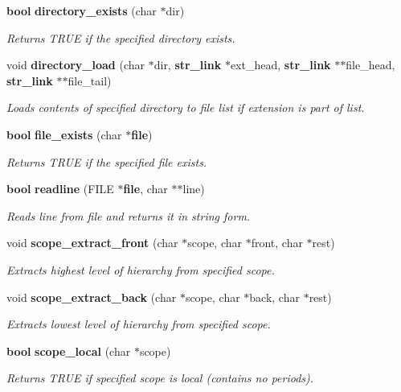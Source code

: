 \begin{CompactItemize}
{\bf bool} {\bf directory\_\-exists} (char $\ast$dir)
\begin{CompactList}\small\item\em Returns TRUE if the specified directory exists.\item\end{CompactList}\item 
void {\bf directory\_\-load} (char $\ast$dir, {\bf str\_\-link} $\ast$ext\_\-head, {\bf str\_\-link} $\ast$$\ast$file\_\-head, {\bf str\_\-link} $\ast$$\ast$file\_\-tail)
\begin{CompactList}\small\item\em Loads contents of specified directory to file list if extension is part of list.\item\end{CompactList}\item 
{\bf bool} {\bf file\_\-exists} (char $\ast${\bf file})
\begin{CompactList}\small\item\em Returns TRUE if the specified file exists.\item\end{CompactList}\item 
{\bf bool} {\bf readline} (FILE $\ast${\bf file}, char $\ast$$\ast$line)
\begin{CompactList}\small\item\em Reads line from file and returns it in string form.\item\end{CompactList}\item 
void {\bf scope\_\-extract\_\-front} (char $\ast$scope, char $\ast$front, char $\ast$rest)
\begin{CompactList}\small\item\em Extracts highest level of hierarchy from specified scope.\item\end{CompactList}\item 
void {\bf scope\_\-extract\_\-back} (char $\ast$scope, char $\ast$back, char $\ast$rest)
\begin{CompactList}\small\item\em Extracts lowest level of hierarchy from specified scope.\item\end{CompactList}\item 
{\bf bool} {\bf scope\_\-local} (char $\ast$scope)
\begin{CompactList}\small\item\em Returns TRUE if specified scope is local (contains no periods).\item\end{CompactList}\item 
$$
\end{CompactItemize}
